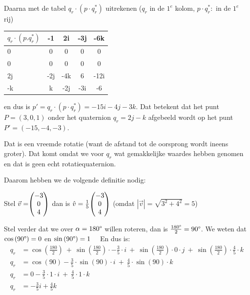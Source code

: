 Daarna met de tabel  $  q_r\cdot (p\cdot q^*_r) $ uitrekenen  
\quad ($  q_r  $ in de $  1^e $ kolom, $  p\cdot q^*_r: $ in de $ 1^e $ rij)

\begin{center}
	\begin{tabular}{ | l || c | c |c |c |}
		\hline
  $q_r\cdot (p.q^*_r)$ & -1  & 2i  & -3j & -6k  \\ \hline \hline
                    0  & 0   & 0   &   0 & 0    \\ \hline
                    0  & 0   & 0   &   0 & 0    \\ \hline
                   2j  & -2j & -4k &   6 & -12i \\ \hline
                   -k  & k   & -2j & -3i & -6   \\ 
		\hline 
	\end{tabular}
\end{center}
en dus is $ p' = q_r\cdot (p\cdot q^*_r) =  -15i -4j -3k. $ Dat betekent dat het punt $ P = (3,0,1) $  onder het quaternion  $ q_r = 2j-k $ afgebeeld wordt op het punt $ P' = (-15, -4, -3). $ 

Dat is een vreemde rotatie (want de afstand tot de oorsprong wordt ineens groter). Dat komt omdat we voor $q_r$ wat gemakkelijke waardes hebben genomen en dat is geen echt rotatiequaternion.


Daarom hebben we de volgende definitie nodig: 

Stel $\vec{v} = \vecdrie{-3}{0}{4} $ dan is $\hat{v} = \frac{1}{5} \vecdrie{-3}{0}{4} $ \quad (omdat $|\vec{v}| = \sqrt{3^2+ 4^2} = 5$)

Stel verder dat we over $\alpha = 180\degree$ willen roteren, dan is $\frac{180\degree}{2} = 90\degree$. We weten dat $  \cos\left(90\degree\right) = 0 $ en  $ \sin\left(90\degree\right) = 1 $ \ \ En dus is: 
\begin{align*}
    q_r &= \cos\left(\frac{180}{2}\right)\ +\ \sin\left(\frac{180}{2}\right) \cdot -\frac{3}{5}\cdot i
           \ +\ \sin\left(\frac{180}{2}\right) \cdot 0\cdot j\ +\ \sin\left(\frac{180}{2}\right) \cdot \frac{4}{5}\cdot k \\
    q_r &= \cos\left(90\right) - \frac{3}{5}\cdot \sin\left(90\right) \cdot i\ +\ \frac{4}{5}\cdot \sin\left(90\right) \cdot k \\
    q_r &= 0 -\frac{3}{5}\cdot 1 \cdot i\ +\ \frac{4}{5}\cdot 1 \cdot k \\
    q_r &= -\frac{3}{5}i + \frac{4}{5}k 
\end{align*}

